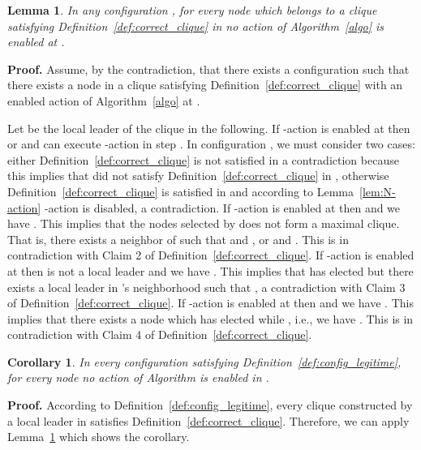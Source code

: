 \documentclass[11pt,letterpaper,onecolumn]{article}
\newtheorem{corollary}{Corollary}
\newtheorem{lemma}{Lemma}
\newenvironment{proof}{\noindent \begin{rm}{\textbf{Proof.} }}{\hspace*{\fill}\par\end{rm} \vspace{.3cm}}
\begin{document}
\begin{lemma}
\label{lem:no_enable_action}
In any configuration , for every node  which belongs to a clique  satisfying Definition~\ref{def:correct_clique} in  no action of Algorithm~\ref{algo} is enabled at .
\end{lemma}

\begin{proof}
Assume, by the contradiction, that there exists a configuration  such that there exists a node  in a clique  satisfying Definition~\ref{def:correct_clique} with an enabled action of Algorithm~\ref{algo} at .

Let  be the local leader of the clique  in the following. If -action is enabled at  then  or  and  can execute -action in step . In configuration , we must consider two cases: either Definition~\ref{def:correct_clique} is not satisfied in  a contradiction because this implies that  did not satisfy Definition~\ref{def:correct_clique} in , otherwise Definition~\ref{def:correct_clique} is satisfied in  and according to Lemma~\ref{lem:N-action} -action is disabled, a contradiction.
If -action is enabled at  then  and we have . This implies that the nodes selected by  does not form a maximal clique. That is, there exists a neighbor  of  such that  and , or  and . This is in contradiction with Claim 2 of Definition~\ref{def:correct_clique}.
If -action is enabled at  then  is not a local leader and we have . This implies that  has elected  but there exists a local leader  in 's neighborhood such that , a contradiction with Claim 3 of Definition~\ref{def:correct_clique}.
If -action is enabled at  then  and we have . This implies that there exists a node  which has elected  while , i.e., we have . This is in contradiction with Claim 4 of Definition~\ref{def:correct_clique}.
\end{proof}

\begin{corollary}
\label{cor:no_enable_action}
In every configuration  satisfying Definition~\ref{def:config_legitime}, for every node  no action of Algorithm  is enabled in .
\end{corollary}

\begin{proof}
According to Definition~\ref{def:config_legitime}, every clique constructed by a local leader in  satisfies Definition~\ref{def:correct_clique}. Therefore, we can apply Lemma~\ref{lem:no_enable_action} which shows the corollary.
\end{proof}
\end{document}

